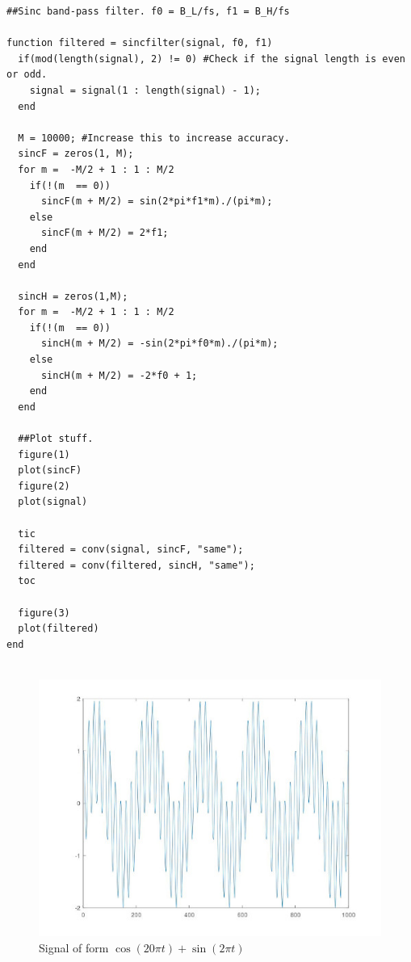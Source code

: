 \documentclass{article}
\begin{document}
\begin{verbatim}
##Sinc band-pass filter. f0 = B_L/fs, f1 = B_H/fs

function filtered = sincfilter(signal, f0, f1)
  if(mod(length(signal), 2) != 0) #Check if the signal length is even or odd.
    signal = signal(1 : length(signal) - 1);
  end
  
  M = 10000; #Increase this to increase accuracy.
  sincF = zeros(1, M);
  for m =  -M/2 + 1 : 1 : M/2 
    if(!(m  == 0))
      sincF(m + M/2) = sin(2*pi*f1*m)./(pi*m);
    else
      sincF(m + M/2) = 2*f1;
    end
  end

  sincH = zeros(1,M);
  for m =  -M/2 + 1 : 1 : M/2 
    if(!(m  == 0))
      sincH(m + M/2) = -sin(2*pi*f0*m)./(pi*m);
    else
      sincH(m + M/2) = -2*f0 + 1;
    end
  end
  
  ##Plot stuff.
  figure(1)
  plot(sincF)
  figure(2)
  plot(signal)

  tic
  filtered = conv(signal, sincF, "same");
  filtered = conv(filtered, sincH, "same");
  toc

  figure(3)
  plot(filtered)
end


\end{verbatim}



\begin{figure}
  \includegraphics[width=\linewidth]{signal.jpg}
   \caption{Signal of form $\cos(20 \pi t) + \sin(2 \pi t)$}
\end{figure}
\end{document}
